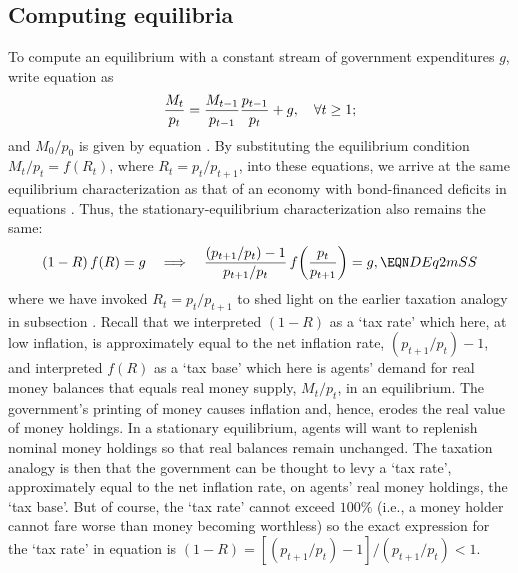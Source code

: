 \subsection{Computing equilibria}
To compute an equilibrium with a constant stream of
government expenditures $g$, write equation  as
$$ {M_t \over  p_t} = {M_{t-1} \over p_{t-1} }  {p_{t-1} \over p_t}
     + g,  \quad \forall t \geq 1;$$
and ${M_0 / p_0}$ is given by equation .
By substituting the equilibrium condition $M_t / p_t = f(R_t)$, where
$R_t=p_t/p_{t+1}$, into these equations, we arrive at the same 
equilibrium characterization as that of an economy 
with bond-financed deficits in equations . Thus, the 
stationary-equilibrium characterization 
also remains the same:
$$ (1-R)\, f(R) = g \quad \Longrightarrow \quad 
   {(p_{t+1}/p_t) -1  \over p_{t+1}/p_t} \,
         f\!\left({p_t \over p_{t+1}}\right) = g, \EQN DEq2mSS 
$$
where we have invoked $R_t=p_t/p_{t+1}$ to shed light on the
earlier taxation analogy in subsection .
Recall that we interpreted $(1-R)$ as a `tax rate' which here,
at low inflation, is approximately equal to the net inflation 
rate, $(p_{t+1}/p_t) -1$, and interpreted $f(R)$ as a `tax base' 
which here is agents' demand for real money balances that
equals real money supply, $M_t /p_t$, in an equilibrium. 
The government's printing of money causes inflation and, 
hence, erodes the real value of money holdings. In a stationary
equilibrium, agents will want to replenish nominal
money holdings so that real balances remain unchanged.
The taxation analogy is then that the government can
be thought to levy a `tax rate', approximately equal to 
the net inflation rate, on agents' real money holdings, 
the `tax base'. But of course, the `tax rate' cannot exceed 
$100 \%$ (i.e., a money holder cannot fare worse than money 
becoming worthless) so the exact expression for the 
`tax rate' in equation  is 
$(1-R)= [(p_{t+1}/p_t) -1] / (p_{t+1}/p_t) <1$.




